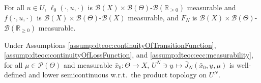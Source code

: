 \documentclass[10pt,a4paper]{amsart}
\newcommand{\Borel}{\mathcal{B}} %
\newcommand{\Pbs}{\mathcal{P}} %
\newcommand{\Rnn}{\mathbb{R}_{\geq 0}} %
\newcommand{\es}{\bar{x}} %
\newcommand{\is}[1]{{\underline{#1}}} %
\begin{document}
\begin{assumption} \label{assump:dteoc:ecc:measurability}
For all $u \in U$, $\ell_0(\cdot,u,\cdot)$ is $\Borel(X)\times\Borel(\Theta)$-$\Borel(\Rnn)$ measurable and $f(\cdot,u,\cdot)$ is $\Borel(X)\times\Borel(\Theta)$-$\Borel(X)$ measurable,
and $F_N$ is $\Borel(X)\times\Borel(\Theta)$-$\Borel(\Rnn)$ measurable.
\end{assumption}

\begin{lemma} \label{lem:dteoc:lscOfCostFunctional}
Under Assumptions \ref{assump:dteoc:continuityOfTransitionFunction}, \ref{assump:dteoc:continuityOfLossFunction}, and \ref{assump:dteoc:ecc:measurability},
for all $\mu \in \Pbs(\Theta)$ and measurable $\es_0 \colon \Theta\rightarrow X$, 
$U^N \ni \is{u} \mapsto \bar J_N(\es_0, \is{u} ,\mu)$ is well-defined and lower semicontinuous w.r.t.~the product topology on $U^N$.
\end{lemma}
\end{document}
